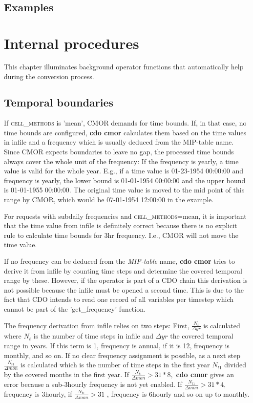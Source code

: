 \subsection{Examples}

\section{Internal procedures}

This chapter illuminates background operator functions that automatically help during the conversion process. 

\subsection{Temporal boundaries}

If \textsc{cell\_methods} is 'mean', CMOR demands for time bounds. If, in that case, no time bounds are configured, \textbf{cdo cmor} calculates them based on the time values in infile and a frequency which is usually deduced from the MIP-table name. Since CMOR expects boundaries to leave no gap, the processed time bounds always cover the whole unit of the frequency: If the frequency is yearly, a time value is valid for the whole year. E.g., if a time value is 01-23-1954 00:00:00 and frequency is yearly, the lower bound is 01-01-1954 00:00:00 and the upper bound is 01-01-1955 00:00:00. The original time value is moved to the mid point of this range by CMOR, which would be 07-01-1954 12:00:00 in the example.

For requests with subdaily frequencies and \textsc{cell\_methods}=mean, it is important that the time value from infile is definitely correct because there is no explicit rule to calculate time bounds for 3hr frequency. I.e., CMOR will not move the time value.

If no frequency can be deduced from the \textit{MIP-table} name, \textbf{cdo cmor} tries to derive it from infile by counting time steps and determine the covered temporal range by these. However, if the operator is part of a CDO chain this derivation is not possible because the infile must be opened a second time. This is due to the fact that CDO intends to read one record of all variables per timestep which cannot be part of the 'get\_frequency' function.

The frequency derivation from infile relies on two steps: First, $ \frac{ N_t }{ \Delta yr } $ is calculated where $N_t$ is the number of time steps in infile and $ \Delta yr$ the covered temporal range in years. If this term is 1, frequency is annual, if it is 12, frequency is monthly, and so on. If no clear frequency assignment is possible, as a next step $ \frac{N_{t1}}{ \Delta mon} $ is calculated which is the number of time steps in the first year $ N_{t1} $ divided by the covered months in the first year. If $ \frac{N_{t1}}{ \Delta mon} > 31*8, $ \textbf{cdo cmor} gives an error because a sub-3hourly frequency is not yet enabled. If $ \frac{N_{t1}}{ \Delta mon} > 31*4 $, frequency is 3hourly, if $\frac{N_{t1}}{ \Delta mon} > 31$ , frequency is 6hourly and so on up to monthly.
                    
